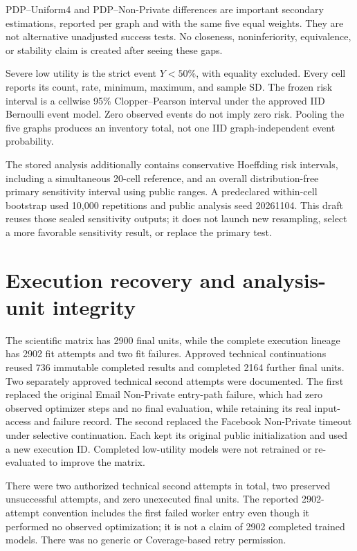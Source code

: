 PDP--Uniform4 and PDP--Non-Private differences are important secondary estimations, reported per graph and with the same five equal weights. They are not alternative unadjusted success tests. No closeness, noninferiority, equivalence, or stability claim is created after seeing these gaps.

Severe low utility is the strict event $Y<50\%$, with equality excluded. Every cell reports its count, rate, minimum, maximum, and sample SD. The frozen risk interval is a cellwise 95\% Clopper--Pearson interval under the approved IID Bernoulli event model. Zero observed events do not imply zero risk. Pooling the five graphs produces an inventory total, not one IID graph-independent event probability.

The stored analysis additionally contains conservative Hoeffding risk intervals, including a simultaneous 20-cell reference, and an overall distribution-free primary sensitivity interval using public ranges. A predeclared within-cell bootstrap used 10,000 repetitions and public analysis seed 20261104. This draft reuses those sealed sensitivity outputs; it does not launch new resampling, select a more favorable sensitivity result, or replace the primary test.

\section{Execution recovery and analysis-unit integrity}
The scientific matrix has 2900 final units, while the complete execution lineage has 2902 fit attempts and two fit failures. Approved technical continuations reused 736 immutable completed results and completed 2164 further final units. Two separately approved technical second attempts were documented. The first replaced the original Email Non-Private entry-path failure, which had zero observed optimizer steps and no final evaluation, while retaining its real input-access and failure record. The second replaced the Facebook Non-Private timeout under selective continuation. Each kept its original public initialization and used a new execution ID. Completed low-utility models were not retrained or re-evaluated to improve the matrix.

There were two authorized technical second attempts in total, two preserved unsuccessful attempts, and zero unexecuted final units. The reported 2902-attempt convention includes the first failed worker entry even though it performed no observed optimization; it is not a claim of 2902 completed trained models. There was no generic or Coverage-based retry permission.

